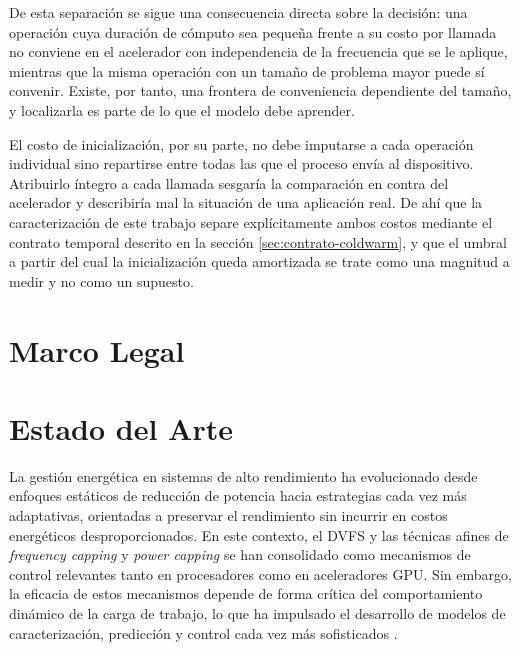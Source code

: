 \documentclass[12pt,oneside,spanish]{book}
\begin{document}
De esta separación se sigue una consecuencia directa sobre la decisión: una operación cuya duración de cómputo sea pequeña frente a su costo por llamada no conviene en el acelerador con independencia de la frecuencia que se le aplique, mientras que la misma operación con un tamaño de problema mayor puede sí convenir. Existe, por tanto, una frontera de conveniencia dependiente del tamaño, y localizarla es parte de lo que el modelo debe aprender.

El costo de inicialización, por su parte, no debe imputarse a cada operación individual sino repartirse entre todas las que el proceso envía al dispositivo. Atribuirlo íntegro a cada llamada sesgaría la comparación en contra del acelerador y describiría mal la situación de una aplicación real. De ahí que la caracterización de este trabajo separe explícitamente ambos costos mediante el contrato temporal descrito en la sección \ref{sec:contrato-coldwarm}, y que el umbral a partir del cual la inicialización queda amortizada se trate como una magnitud a medir y no como un supuesto.



\section{Marco Legal}


\section{Estado del Arte}

La gestión energética en sistemas de alto rendimiento ha evolucionado desde enfoques estáticos de reducción de potencia hacia estrategias cada vez más adaptativas, orientadas a preservar el rendimiento sin incurrir en costos energéticos desproporcionados. En este contexto, el DVFS y las técnicas afines de \textit{frequency capping} y \textit{power capping} se han consolidado como mecanismos de control relevantes tanto en procesadores como en aceleradores GPU. Sin embargo, la eficacia de estos mecanismos depende de forma crítica del comportamiento dinámico de la carga de trabajo, lo que ha impulsado el desarrollo de modelos de caracterización, predicción y control cada vez más sofisticados \cite{Simsek2024,Costa2025,Calore2017,Ali2023,Guerreiro2019}.
\end{document}
